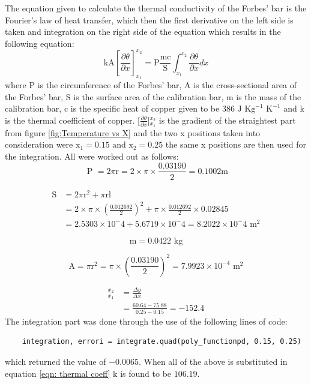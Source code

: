 \documentclass[12pt, a4paper]{article}
\begin{document}
\noindent
The equation given to calculate the thermal conductivity of the Forbes' bar is the Fourier's law of heat transfer, which then the first derivative on the left side is taken and integration on the  right side of the equation which results in the following equation:
\begin{equation}\label{eqn: thermal coeff}
    \text{kA}[\frac{\partial \theta}{\partial x}]_{x_1}^{x_2} = \text{P}\frac{\text{mc}}{\text{S}}\int_{x_1}^{x_2} \frac{\partial \theta}{\partial x} dx
\end{equation}
where P is the circumference of the Forbes' bar, A is the cross-sectional area of the Forbes' bar, S is the surface area of the calibration bar, m is the mass of the calibration bar, c is the specific heat of copper given to be $386 \text{ J} \text{ Kg}^{-1} \text{ K}^{-1}$ and k is the thermal coefficient of copper. [$\frac{\partial \theta}{\partial x}$]$_{x_1}^{x_2}$ is the gradient of the straightest part from figure \ref{fig:Temperature vs X} and the two x positions taken into consideration were $\text{x}_1 = 0.15 \text{ and } \text{x}_2 = 0.25$ the same x positions are then used for the integration. All were worked out as follows:
\begin{equation*}
    \text{ P } = 2 \pi \text{r}
    = 2 \times \pi \times \frac{0.03190}{2}
    = 0.1002 \text{m}
\end{equation*}

\begin{align*}
\text{S} &= 2 \pi \text{r}^2 + \pi \text{rl}\\
&= 2 \times \pi \times (\frac{0.012692}{2})^2 + \pi \times \frac{0.012692}{2} \times 0.02845\\
&= 2.5303\times 10^-4 + 5.6719\times 10^-4
= 8.2022\times 10^-4 \text{ m}^2
\end{align*}

\begin{equation*}
    \text{m} = 0.0422 \text{ kg}
\end{equation*}

\begin{equation*}
    \text{A} = \pi \text{r}^2
    = \pi \times (\frac{0.03190}{2})^2
    = 7.9923\times 10^{-4} \text{ m}^2
\end{equation*}

\begin{align*}
    [\frac{\partial \theta}{\partial x}]_{x_1}^{x_2} &= \frac{\Delta y}{\Delta x}\\
    &= \frac{60.64 - 75.88}{0.25 - 0.15} = -152.4
\end{align*}
The integration part was done through the use of the following lines of code:
\begin{verbatim}
    integration, errori = integrate.quad(poly_functionpd, 0.15, 0.25)
\end{verbatim}
which returned the value of $-0.0065$. When all of the above is substituted in equation \ref{eqn: thermal coeff} k is found to be $106.19$.
\end{document}
